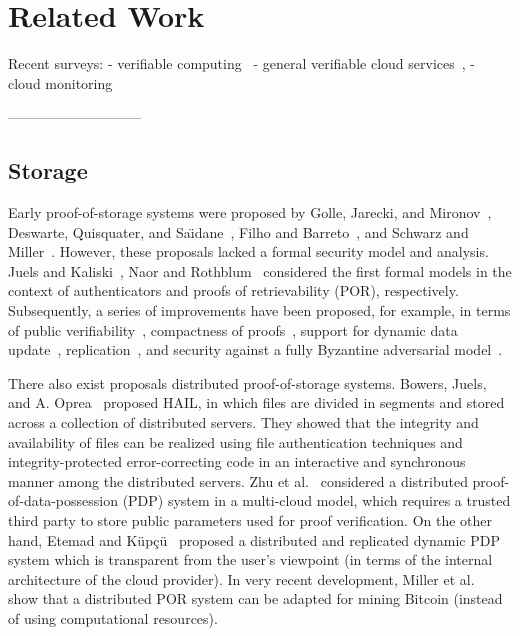 \section{Related Work} \label{sect:related-work}


Recent surveys:
- verifiable computing~\cite{WB13} 
- general verifiable cloud services~\cite{BCC+13}, 
- cloud monitoring~\cite{ABD+13,FEH+14}

-----------------------------

\subsection{Storage}

Early proof-of-storage systems were proposed by Golle, Jarecki, and Mironov~\cite{GJM02}, Deswarte, Quisquater, and Sa\"{\i}dane~\cite{DQS03}, Filho and Barreto~\cite{FB06}, and Schwarz and Miller~\cite{SM06}.
However, these proposals lacked a formal security model and analysis.
Juels and Kaliski~\cite{JK07}, Naor and Rothblum~\cite{NR09} considered the first formal models in the context of authenticators and proofs of retrievability (POR), respectively.
Subsequently, a series of improvements have been proposed, for example, in terms of public verifiability~\cite{AKK09,ABC+11}, compactness of proofs~\cite{SW13}, support for dynamic data update~\cite{ADM+08,EKP+09,WWL+09,SDJ+12,CKW13,SSP13}, replication~\cite{CKB+08}, and security against a fully Byzantine adversarial model~\cite{BJO09a}.

There also exist proposals distributed proof-of-storage systems.
Bowers, Juels, and A. Oprea~\cite{BJO09b} proposed HAIL, in which files are divided in segments and stored across a collection of distributed servers.
They showed that the integrity and availability of files can be realized using file authentication techniques and integrity-protected error-correcting code in an interactive and synchronous manner among the distributed servers.
Zhu et al.~\cite{ZHA+12} considered a distributed proof-of-data-possession (PDP) system in a multi-cloud model, which requires a trusted third party to store public parameters used for proof verification.
On the other hand, Etemad and K{\"u}p\c{c}{\"u}~\cite{EK13} proposed a distributed and replicated dynamic PDP system which is transparent from the user's viewpoint (in terms of the internal architecture of the cloud provider).
In very recent development, Miller et al.~\cite{MJS+14} show that a distributed POR system can be adapted for mining Bitcoin (instead of using computational resources).

